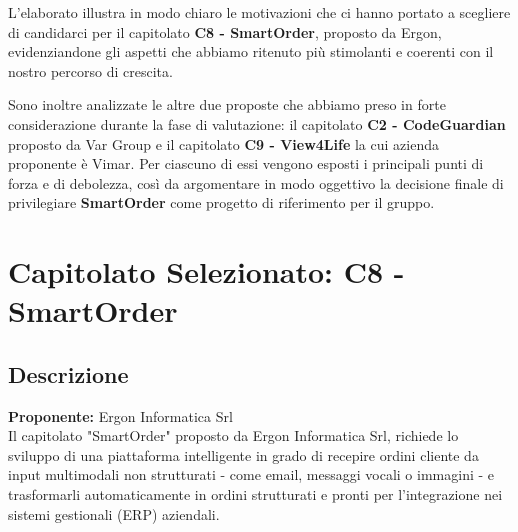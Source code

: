 \documentclass{article}
\begin{document}
	L'elaborato illustra in modo chiaro le motivazioni che ci hanno portato a scegliere di candidarci per il capitolato \textbf{C8 - SmartOrder}, proposto da Ergon, evidenziandone gli aspetti che abbiamo ritenuto più stimolanti e coerenti con il nostro percorso di crescita.
	
	Sono inoltre analizzate le altre due proposte che abbiamo preso in forte considerazione durante la fase di valutazione: il capitolato \textbf{C2 - CodeGuardian} proposto da Var Group e il capitolato \textbf{C9 - View4Life} la cui azienda proponente è Vimar. Per ciascuno di essi vengono esposti i principali punti di forza e di debolezza, così da argomentare in modo oggettivo la decisione finale di privilegiare \textbf{SmartOrder} come progetto di riferimento per il gruppo.
	
	\section{Capitolato Selezionato: C8 - SmartOrder}
	\subsection{Descrizione}
    \textbf{Proponente:} Ergon Informatica Srl\\
	Il capitolato "SmartOrder" proposto da Ergon Informatica Srl, richiede lo sviluppo di una piattaforma intelligente in grado di recepire ordini cliente da input multimodali non strutturati - come email, messaggi vocali o immagini - e trasformarli automaticamente in ordini strutturati e pronti per l'integrazione nei sistemi gestionali (ERP) aziendali.
	
\end{document}
